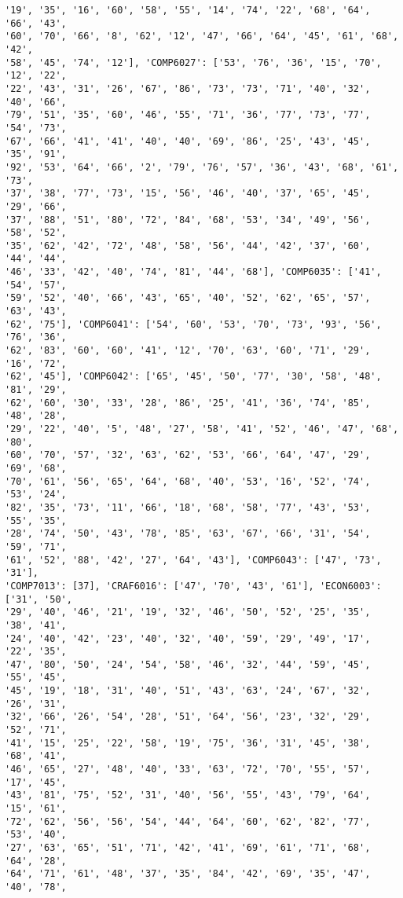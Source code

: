 \documentclass[11pt]{article}
\begin{document}
\begin{Verbatim}[commandchars=\\\{\}]
'19', '35', '16', '60', '58', '55', '14', '74', '22', '68', '64', '66', '43',
'60', '70', '66', '8', '62', '12', '47', '66', '64', '45', '61', '68', '42',
'58', '45', '74', '12'], 'COMP6027': ['53', '76', '36', '15', '70', '12', '22',
'22', '43', '31', '26', '67', '86', '73', '73', '71', '40', '32', '40', '66',
'79', '51', '35', '60', '46', '55', '71', '36', '77', '73', '77', '54', '73',
'67', '66', '41', '41', '40', '40', '69', '86', '25', '43', '45', '35', '91',
'92', '53', '64', '66', '2', '79', '76', '57', '36', '43', '68', '61', '73',
'37', '38', '77', '73', '15', '56', '46', '40', '37', '65', '45', '29', '66',
'37', '88', '51', '80', '72', '84', '68', '53', '34', '49', '56', '58', '52',
'35', '62', '42', '72', '48', '58', '56', '44', '42', '37', '60', '44', '44',
'46', '33', '42', '40', '74', '81', '44', '68'], 'COMP6035': ['41', '54', '57',
'59', '52', '40', '66', '43', '65', '40', '52', '62', '65', '57', '63', '43',
'62', '75'], 'COMP6041': ['54', '60', '53', '70', '73', '93', '56', '76', '36',
'62', '83', '60', '60', '41', '12', '70', '63', '60', '71', '29', '16', '72',
'62', '45'], 'COMP6042': ['65', '45', '50', '77', '30', '58', '48', '81', '29',
'62', '60', '30', '33', '28', '86', '25', '41', '36', '74', '85', '48', '28',
'29', '22', '40', '5', '48', '27', '58', '41', '52', '46', '47', '68', '80',
'60', '70', '57', '32', '63', '62', '53', '66', '64', '47', '29', '69', '68',
'70', '61', '56', '65', '64', '68', '40', '53', '16', '52', '74', '53', '24',
'82', '35', '73', '11', '66', '18', '68', '58', '77', '43', '53', '55', '35',
'28', '74', '50', '43', '78', '85', '63', '67', '66', '31', '54', '59', '71',
'61', '52', '88', '42', '27', '64', '43'], 'COMP6043': ['47', '73', '31'],
'COMP7013': [37], 'CRAF6016': ['47', '70', '43', '61'], 'ECON6003': ['31', '50',
'29', '40', '46', '21', '19', '32', '46', '50', '52', '25', '35', '38', '41',
'24', '40', '42', '23', '40', '32', '40', '59', '29', '49', '17', '22', '35',
'47', '80', '50', '24', '54', '58', '46', '32', '44', '59', '45', '55', '45',
'45', '19', '18', '31', '40', '51', '43', '63', '24', '67', '32', '26', '31',
'32', '66', '26', '54', '28', '51', '64', '56', '23', '32', '29', '52', '71',
'41', '15', '25', '22', '58', '19', '75', '36', '31', '45', '38', '68', '41',
'46', '65', '27', '48', '40', '33', '63', '72', '70', '55', '57', '17', '45',
'43', '81', '75', '52', '31', '40', '56', '55', '43', '79', '64', '15', '61',
'72', '62', '56', '56', '54', '44', '64', '60', '62', '82', '77', '53', '40',
'27', '63', '65', '51', '71', '42', '41', '69', '61', '71', '68', '64', '28',
'64', '71', '61', '48', '37', '35', '84', '42', '69', '35', '47', '40', '78',

\end{Verbatim}
\end{document}
